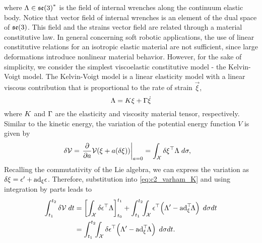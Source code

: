 where ${\Lambda} \in {\mathfrak{se}(3)}^*$ is the field of internal wrenches along the continuum elastic body. Notice that vector field of internal wrenches is an element of the dual space of ${\mathfrak{se}(3)}$. This field and the strains vector field are related through a material constitutive law. In general concerning soft robotic applications, the use of linear constitutive relations for an isotropic elastic material are not sufficient, since large deformations introduce nonlinear material behavior. However, for the sake of simplicity, we consider the simplest viscoelastic constitutive model - the Kelvin-Voigt model. The Kelvin-Voigt model is a linear elasticity model with a linear viscous contribution that is proportional to the rate of strain $\vec{\xi}$, 
\begin{equation}
{\Lambda} = {K}{\xi} + {\Gamma} \dot{{\xi}}
\end{equation}
where ${K}$ and ${\Gamma}$ are the elasticity and viscosity material tensor, respectively. Similar to the kinetic energy, the variation of the potential energy function $V$ is given by
\begin{align}
\delta\mathcal{V} & = \left. \frac{\partial }{\partial a} \mathcal{V}({\xi} + a (\delta{\xi})) \right|_{a = 0} = \int_{\mathcal{X}} \delta{\xi}^\top \Lambda  \; d\sigma,
 \label{eq:c2_varham_K}
\end{align}
\noindent Recalling the commutativity of the Lie algebra, we can express the variation as $\delta{\xi} = {{\epsilon}}' + \text{ad}_{{\xi}} {\epsilon}$. Therefore, substitution into \eqref{eq:c2_varham_K} and using integration by parts leads to 
\begin{align}
\int_{t_1}^{t_2} \delta\mathcal{V} \; dt& = 
\left[ \int_\mathcal{X} \delta \vec{\epsilon}^\tr \Lambda  \right]_{t_0}^{t_1} +  \int_{t_1}^{t_2} \!\! \int_\mathcal{X}  \vec{\epsilon}^\tr \! \left( \Lambda' - \ad_{\vec{\xi}}^\tr \! \Lambda\right)\; d\sigma dt \notag \\ 
& = \int_{t_1}^{t_2} \!\! \int_\mathcal{X} \delta \vec{\epsilon}^\tr \!\left( \Lambda' - \ad_{\vec{\xi}}^\tr \! \Lambda \right)\;d\sigma dt\label{eq:c2_varham_K2}.
\end{align}

